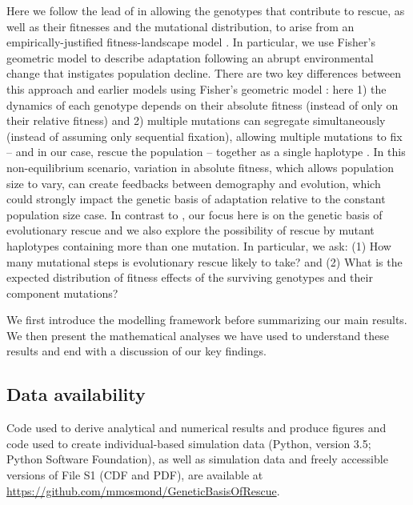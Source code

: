 \documentclass[9pt,twocolumn,twoside,lineno]{gsajnl}
\begin{document}
Here we follow the lead of \cite{Anciaux2018} in allowing the genotypes that contribute to rescue, as well as their fitnesses and the mutational distribution, to arise from an empirically-justified fitness-landscape model \citep{Tenaillon2014}.
In particular, we use Fisher's geometric model to describe adaptation following an abrupt environmental change that instigates population decline.
There are two key differences between this approach and earlier models using Fisher's geometric model \citep[e.g.,][]{Orr1998}:
here
1) the dynamics of each genotype depends on their absolute fitness (instead of only on their relative fitness) and
2) multiple mutations can segregate simultaneously (instead of assuming only sequential fixation), allowing multiple mutations to fix -- and in our case, rescue the population -- together as a single haplotype \citep[i.e., stochastic tunnelling,][]{iwasa2004stochastic}.
In this non-equilibrium scenario, variation in absolute fitness, which allows population size to vary, can create feedbacks between demography and evolution, which could strongly impact the genetic basis of adaptation relative to the constant population size case.
In contrast to \cite{Anciaux2018}, our focus here is on the genetic basis of evolutionary rescue and we also explore the possibility of rescue by mutant haplotypes containing more than one mutation.
In particular, we ask: (1) How many mutational steps is evolutionary rescue likely to take? and (2) What is the expected distribution of fitness effects of the surviving genotypes and their component mutations?

We first introduce the modelling framework before summarizing our main results.
We then present the mathematical analyses we have used to understand these results and end with a discussion of our key findings.

\subsection{Data availability}

Code used to derive analytical and numerical results and produce figures \citep[referred to here as File S1; \textit{Mathematica}, version 9.0;][]{Mathematica} and
code used to create individual-based simulation data (Python, version 3.5; Python Software Foundation),
as well as simulation data and freely accessible versions of File S1 (CDF and PDF), are available at \url{https://github.com/mmosmond/GeneticBasisOfRescue}.
\end{document}
